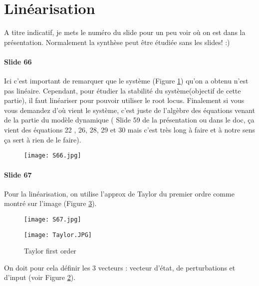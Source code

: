 \section{Linéarisation}
A titre indicatif, je mets le numéro du slide pour un peu voir où on est dans la présentation. Normalement la synthèse peut être étudiée sans les slides! :)
\paragraph{Slide 66}

Ici c'est important de remarquer que le système (Figure \ref{fig:S66}) qu'on a obtenu n'est pas linéaire. Cependant, pour étudier la stabilité du système(objectif de cette partie), il faut linéariser pour pouvoir utiliser le root locus. Finalement si vous vous demandez d'où vient le système, c'est juste de l'algèbre des équations venant de la partie du modèle dynamique ( Slide 59 de la présentation ou dans le doc, ça vient des équations 22 , 26, 28, 29 et 30 mais c'est très long à faire et à notre sens ça sert à rien de le faire).
\begin{figure}[H]
    \centering
    \texttt{[image: S66.jpg]}
    \caption{}
    \label{fig:S66}
\end{figure}

\paragraph{Slide 67} 

Pour la linéarisation, on utilise l'approx de Taylor du premier ordre comme montré sur l'image (Figure \ref{fig:Taylor}). 
\begin{figure}
\centering
\texttt{[image: S67.jpg]}
\caption{}
\label{fig:S67}
\end{figure}


\begin{figure}[H]
    \centering
    \texttt{[image: Taylor.JPG]}
    \caption{Taylor first order}
    \label{fig:Taylor}
\end{figure}
On doit pour cela définir les 3 vecteurs : vecteur d'état, de perturbations et d'input (voir Figure \ref{fig:S67}).

